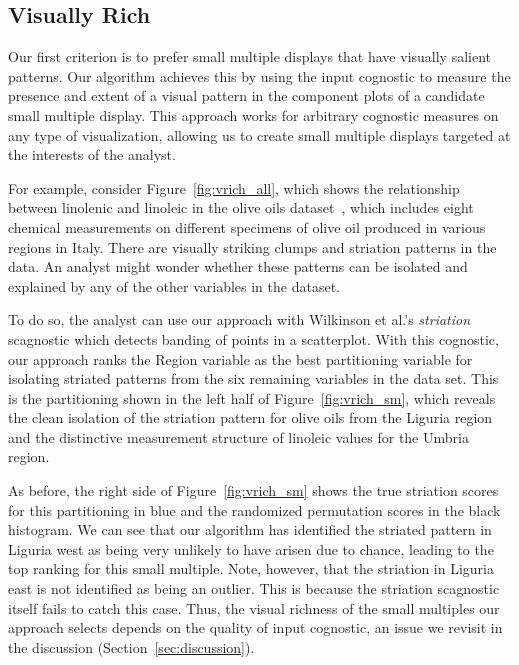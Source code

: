 \subsection{Visually Rich}
Our first criterion is to prefer small multiple displays that have visually salient patterns. Our algorithm achieves this by using the input cognostic to measure the presence and extent of a visual pattern in the component plots of a candidate small multiple display. This approach works for arbitrary cognostic measures on any type of visualization, allowing us to create small multiple displays targeted at the interests of the analyst. 

For example, consider Figure~\ref{fig:vrich_all}, which shows the relationship between linolenic and linoleic in the olive oils dataset~\cite{Forina1983}, which includes eight chemical measurements on different specimens of olive oil produced in various regions in Italy. There are visually striking clumps and striation patterns in the data. An analyst might wonder whether these patterns can be isolated and explained by any of the other variables in the dataset.

To do so, the analyst can use our approach with Wilkinson et al.'s \emph{striation} scagnostic which detects banding of points in a scatterplot. With this cognostic, our approach ranks the Region variable as the best partitioning variable for isolating striated patterns from the six remaining variables in the data set. This is the partitioning shown in the left half of Figure~\ref{fig:vrich_sm}, which reveals the clean isolation of the striation pattern for olive oils from the Liguria region and the distinctive measurement structure of linoleic values for the Umbria region.

As before, the right side of Figure~\ref{fig:vrich_sm} shows the true striation scores for this partitioning in blue and the randomized permutation scores in the black histogram. We can see that our algorithm has identified the striated pattern in Liguria west as being very unlikely to have arisen due to chance, leading to the top ranking for this small multiple. 
Note, however, that the striation in Liguria east is not identified as being an outlier. This is because the striation scagnostic itself fails to catch this case. Thus, the visual richness of the small multiples our approach selects depends on the quality of input cognostic, an issue we revisit in the discussion (Section~\ref{sec:discussion}).

